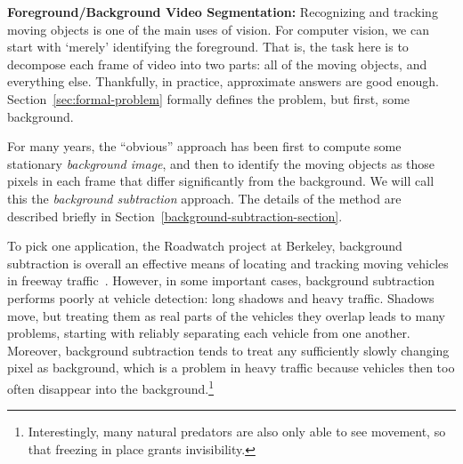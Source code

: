 \newcommand{\secref}[1]{Section~\ref{#1}}
\newcommand{\figref}[1]{Figure~\ref{#1}}
\newcommand{\tabref}[1]{Table~\ref{#1}}
\renewcommand{\eqref}[1]{Equation~(\ref{#1})}

\newcommand{\mbf}[1]{\mbox{{\bf #1}}}
\newcommand{\smbf}[1]{\mbox{{\scriptsize\bf #1}}}
\def\w{\mbf{w}}


{\bf Foreground/Background Video Segmentation:}
Recognizing and tracking moving
objects is one of the main uses of vision.
For computer vision, we can start with `merely' identifying the
foreground.
That is, the task here is to decompose
each frame of video into two parts: all of the moving objects, and
everything else.  Thankfully, in practice, approximate answers are
good enough.  \secref{sec:formal-problem} formally defines the problem,
but first, some background.

For many years, the ``obvious'' approach has
been first to compute some stationary {\em background image}, and then to
identify the moving objects as those pixels in each frame that
differ significantly from the background. We will call this the
{\em background subtraction} approach.
The details of the method are described briefly in
\secref{background-subtraction-section}.

To pick one application, the Roadwatch project at Berkeley,
background subtraction is overall an effective means of
locating and tracking moving vehicles in freeway
traffic~\cite{Koller+al:1994}.
However, in some important cases, background subtraction performs
poorly at vehicle detection: long shadows and heavy traffic.
Shadows move, but treating them as real parts of the vehicles they
overlap leads to many problems, starting with reliably separating each
vehicle from one another.
Moreover, background subtraction tends to treat any
sufficiently slowly changing pixel as
background, which is a problem in heavy traffic because vehicles
then too often disappear into the background.\footnote{Interestingly,
  many natural predators are also only able to see movement, so that
  freezing in place grants invisibility.}

